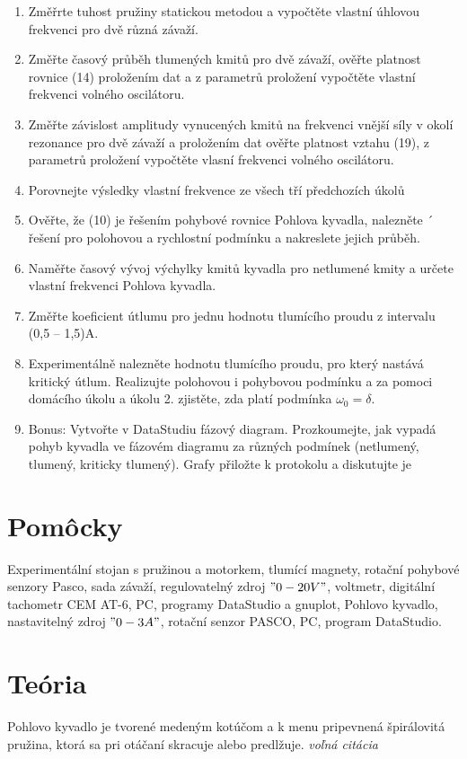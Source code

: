 \documentclass[a4paper,10pt]{article}
\begin{document}
\begin{enumerate}
\item Změřrte tuhost pružiny statickou metodou a vypočtěte vlastní úhlovou frekvenci pro dvě různá
závaží.
\item Změřte časový průběh tlumených kmitů pro dvě závaží, ověřte platnost rovnice (14) proložením
dat a z parametrů proložení vypočtěte vlastní frekvenci volného oscilátoru.
\item Změřte závislost amplitudy vynucených kmitů na frekvenci vnější síly v okolí rezonance pro
dvě závaží a proložením dat ověřte platnost vztahu (19), z parametrů proložení vypočtěte vlasní
frekvenci volného oscilátoru.
\item Porovnejte výsledky vlastní frekvence ze všech tří předchozích úkolů
\item Ověřte, že (10) je řešením pohybové rovnice Pohlova kyvadla, nalezněte ´
řešení pro polohovou a rychlostní podmínku a nakreslete jejich průběh.
\item Naměřte časový vývoj výchylky kmitů kyvadla pro netlumené kmity a určete vlastní frekvenci
Pohlova kyvadla.
\item Změřte koeficient útlumu pro jednu hodnotu tlumícího proudu z intervalu (0,5 – 1,5)A.
\item Experimentálně nalezněte hodnotu tlumícího proudu, pro který nastává kritický útlum. Realizujte
polohovou i pohybovou podmínku a za pomoci domácího úkolu a úkolu 2. zjistěte, zda
platí podmínka $\omega_0 = \delta$.
\item Bonus: Vytvořte v DataStudiu fázový diagram. Prozkoumejte, jak vypadá pohyb kyvadla ve
fázovém diagramu za různých podmínek (netlumený, tlumený, kriticky tlumený). Grafy přiložte
k protokolu a diskutujte je


\end{enumerate}



\section{Pomôcky}
Experimentální stojan s pružinou a motorkem, tlumící magnety, rotační pohybové
senzory Pasco, sada závaží, regulovatelný zdroj $"0-20 V"$, voltmetr, digitální tachometr CEM AT-6,
PC, programy DataStudio a gnuplot, Pohlovo kyvadlo, nastavitelný zdroj $"0-3 A"$, rotační senzor PASCO, PC, program
DataStudio.


\section{Teória}
Pohlovo kyvadlo je tvorené medeným kotúčom a k menu pripevnená špirálovitá pružina, ktorá sa pri otáčaní skracuje alebo predlžuje. \cite{C_2}\textit{voľná citácia}
\end{document}
